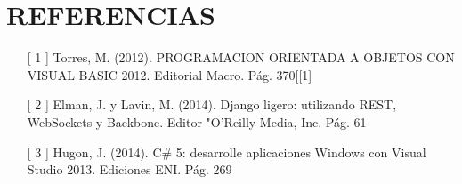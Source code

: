 \section{REFERENCIAS}

\begin{itemize}
	\item [[ 1]]  Torres, M. (2012). PROGRAMACION ORIENTADA A OBJETOS CON VISUAL BASIC 2012. Editorial Macro. Pág. 370[[1]
 	\item   [[ 2]] Elman, J. y Lavin, M. (2014). Django ligero: utilizando REST, WebSockets y Backbone. Editor "O'Reilly Media, Inc. Pág. 61
	\item  [[ 3]]  Hugon, J. (2014). C\# 5: desarrolle aplicaciones Windows con Visual Studio 2013. Ediciones ENI. Pág. 269
\end{itemize}
